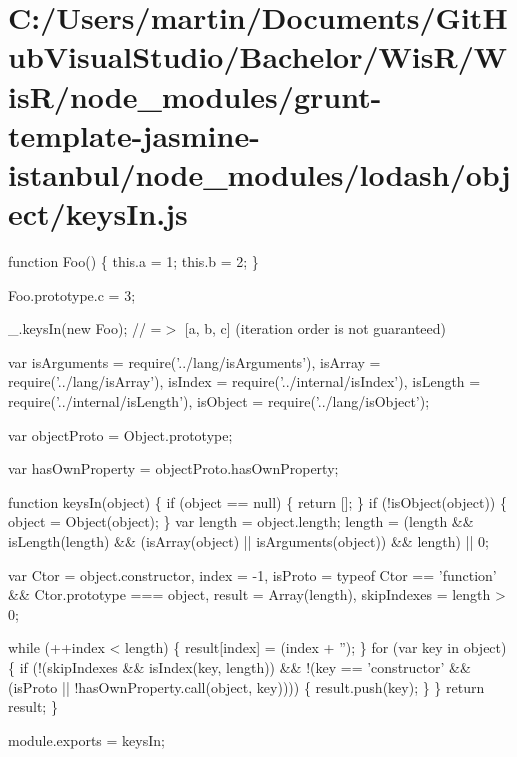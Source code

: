 \hypertarget{_c_1_2_users_2martin_2_documents_2_git_hub_visual_studio_2_bachelor_2_wis_r_2_wis_r_2node_module891a234ff3a7f38590eac4dfb5ebb9e2}{}\section{C\+:/\+Users/martin/\+Documents/\+Git\+Hub\+Visual\+Studio/\+Bachelor/\+Wis\+R/\+Wis\+R/node\+\_\+modules/grunt-\/template-\/jasmine-\/istanbul/node\+\_\+modules/lodash/object/keys\+In.\+js}
function Foo() \{ this.\+a = 1; this.\+b = 2; \}

Foo.\+prototype.\+c = 3;

\+\_\+.\+keys\+In(new Foo); // =$>$ \mbox{[}\textquotesingle{}a\textquotesingle{}, \textquotesingle{}b\textquotesingle{}, \textquotesingle{}c\textquotesingle{}\mbox{]} (iteration order is not guaranteed)


\begin{DoxyCodeInclude}
var isArguments = require(\textcolor{stringliteral}{'../lang/isArguments'}),
    isArray = require(\textcolor{stringliteral}{'../lang/isArray'}),
    isIndex = require(\textcolor{stringliteral}{'../internal/isIndex'}),
    isLength = require(\textcolor{stringliteral}{'../internal/isLength'}),
    isObject = require(\textcolor{stringliteral}{'../lang/isObject'});

var objectProto = Object.prototype;

var hasOwnProperty = objectProto.hasOwnProperty;

\textcolor{keyword}{function} keysIn(\textcolor{keywordtype}{object}) \{
  \textcolor{keywordflow}{if} (\textcolor{keywordtype}{object} == null) \{
    \textcolor{keywordflow}{return} [];
  \}
  \textcolor{keywordflow}{if} (!isObject(\textcolor{keywordtype}{object})) \{
    \textcolor{keywordtype}{object} = Object(\textcolor{keywordtype}{object});
  \}
  var length = \textcolor{keywordtype}{object}.length;
  length = (length && isLength(length) &&
    (isArray(\textcolor{keywordtype}{object}) || isArguments(\textcolor{keywordtype}{object})) && length) || 0;

  var Ctor = \textcolor{keywordtype}{object}.constructor,
      index = -1,
      isProto = typeof Ctor == \textcolor{stringliteral}{'function'} && Ctor.prototype === object,
      result = Array(length),
      skipIndexes = length > 0;

  \textcolor{keywordflow}{while} (++index < length) \{
    result[index] = (index + \textcolor{stringliteral}{''});
  \}
  \textcolor{keywordflow}{for} (var key in \textcolor{keywordtype}{object}) \{
    \textcolor{keywordflow}{if} (!(skipIndexes && isIndex(key, length)) &&
        !(key == \textcolor{stringliteral}{'constructor'} && (isProto || !hasOwnProperty.call(\textcolor{keywordtype}{object}, key)))) \{
      result.push(key);
    \}
  \}
  \textcolor{keywordflow}{return} result;
\}

module.exports = keysIn;
\end{DoxyCodeInclude}
 
